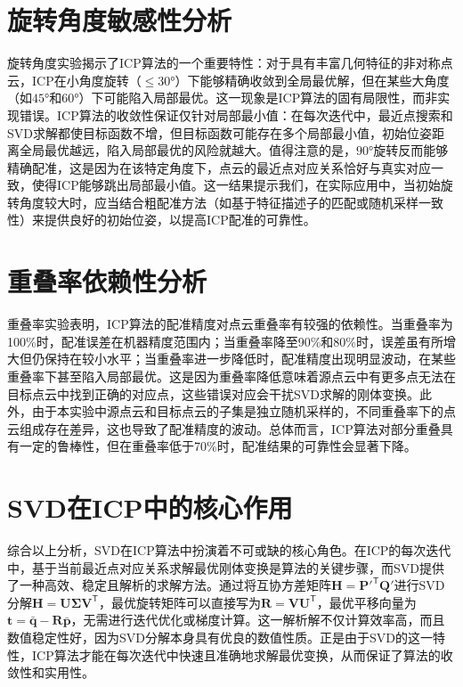 \documentclass[a4paper,12pt]{ctexrep}
\begin{document}
\section{旋转角度敏感性分析}

旋转角度实验揭示了ICP算法的一个重要特性：对于具有丰富几何特征的非对称点云，ICP在小角度旋转（$\leq 30°$）下能够精确收敛到全局最优解，但在某些大角度（如$45°$和$60°$）下可能陷入局部最优。这一现象是ICP算法的固有局限性，而非实现错误。ICP算法的收敛性保证仅针对局部最小值：在每次迭代中，最近点搜索和SVD求解都使目标函数不增，但目标函数可能存在多个局部最小值，初始位姿距离全局最优越远，陷入局部最优的风险就越大。值得注意的是，$90°$旋转反而能够精确配准，这是因为在该特定角度下，点云的最近点对应关系恰好与真实对应一致，使得ICP能够跳出局部最小值。这一结果提示我们，在实际应用中，当初始旋转角度较大时，应当结合粗配准方法（如基于特征描述子的匹配或随机采样一致性）来提供良好的初始位姿，以提高ICP配准的可靠性。

\section{重叠率依赖性分析}

重叠率实验表明，ICP算法的配准精度对点云重叠率有较强的依赖性。当重叠率为100\%时，配准误差在机器精度范围内；当重叠率降至90\%和80\%时，误差虽有所增大但仍保持在较小水平；当重叠率进一步降低时，配准精度出现明显波动，在某些重叠率下甚至陷入局部最优。这是因为重叠率降低意味着源点云中有更多点无法在目标点云中找到正确的对应点，这些错误对应会干扰SVD求解的刚体变换。此外，由于本实验中源点云和目标点云的子集是独立随机采样的，不同重叠率下的点云组成存在差异，这也导致了配准精度的波动。总体而言，ICP算法对部分重叠具有一定的鲁棒性，但在重叠率低于70\%时，配准结果的可靠性会显著下降。

\section{SVD在ICP中的核心作用}

综合以上分析，SVD在ICP算法中扮演着不可或缺的核心角色。在ICP的每次迭代中，基于当前最近点对应关系求解最优刚体变换是算法的关键步骤，而SVD提供了一种高效、稳定且解析的求解方法。通过将互协方差矩阵$\bm{H}=\bm{P}'^{\mathsf{T}}\bm{Q}'$进行SVD分解$\bm{H}=\bm{U}\bm{\Sigma}\bm{V}^{\mathsf{T}}$，最优旋转矩阵可以直接写为$\bm{R}=\bm{V}\bm{U}^{\mathsf{T}}$，最优平移向量为$\bm{t}=\bar{\bm{q}}-\bm{R}\bar{\bm{p}}$，无需进行迭代优化或梯度计算。这一解析解不仅计算效率高，而且数值稳定性好，因为SVD分解本身具有优良的数值性质。正是由于SVD的这一特性，ICP算法才能在每次迭代中快速且准确地求解最优变换，从而保证了算法的收敛性和实用性。
\end{document}
